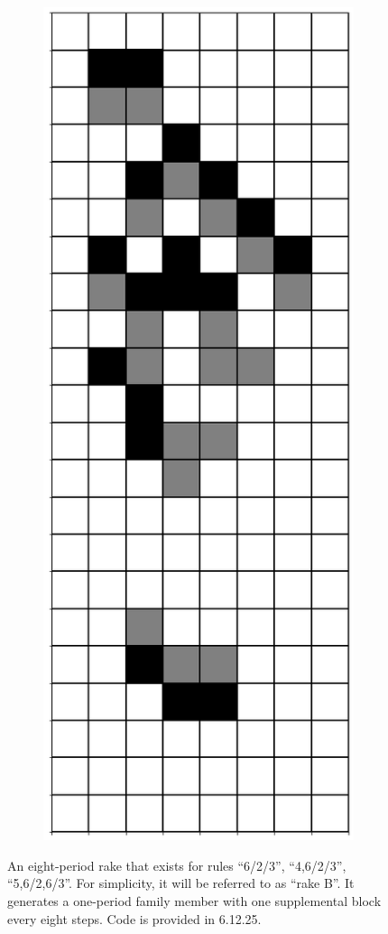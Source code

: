 \documentclass[12pt]{article}
\numberwithin{figure}{section} %
\begin{document}
\begin{figure}[H]
\begin{subfigure}{0.19\textwidth}
     \subcaption{}
   \end{subfigure}
           \begin{subfigure}{0.19\textwidth}
     \centering
     \includegraphics[width=\linewidth]{Section4/28.8}
     \subcaption{}
   \end{subfigure}

\caption{An eight-period rake that exists for rules “6/2/3”, “4,6/2/3”, “5,6/2,6/3”. For simplicity, it will be referred to as “rake B”. It generates a one-period family member with one supplemental block every eight steps. Code is provided in 6.12.25. }
\label{fig:eight-period rake one}
\end{figure}
\end{document}
